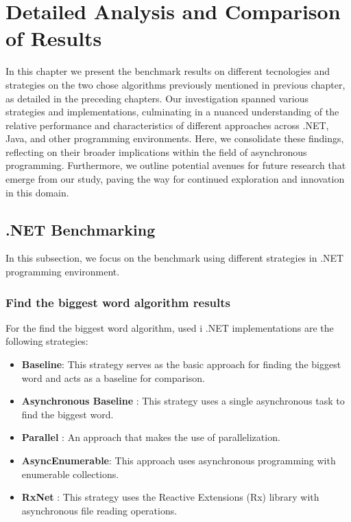 
\chapter{Detailed Analysis and Comparison of Results}
\label{cha:conclusions_future_directions}
In this chapter we present the benchmark results on different tecnologies and strategies on the two chose algorithms previously mentioned in previous chapter, as detailed in the preceding chapters. Our investigation spanned various strategies and implementations, culminating in a nuanced understanding of the relative performance and characteristics of different approaches across .NET, Java, and other programming environments. Here, we consolidate these findings, reflecting on their broader implications within the field of asynchronous programming. Furthermore, we outline potential avenues for future research that emerge from our study, paving the way for continued exploration and innovation in this domain.


\section{.NET Benchmarking}
\label{sec:dotnet_implementation}

In this subsection, we focus on the benchmark using different strategies in .NET programming environment.


\subsection{Find the biggest word algorithm results}
\label{subsubsec:biggest_word_results_cs}

For the find the biggest word algorithm, used i .NET implementations are the following strategies:

\begin{itemize}
    \item \textbf{Baseline}: This strategy serves as the basic approach for finding the biggest word and acts as a baseline for comparison.
    \item \textbf{Asynchronous Baseline }: This strategy uses a single asynchronous task to find the biggest word.
    \item \textbf{Parallel }: An approach that makes the use of parallelization.
    \item \textbf{AsyncEnumerable}: This approach uses asynchronous programming with enumerable collections.
    \item \textbf{RxNet }: This strategy uses the Reactive Extensions (Rx) library with asynchronous file reading operations.
\end{itemize}


